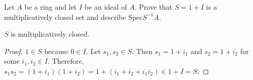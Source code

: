\begin{problem}
Let $A$ be a ring and let $I$ be an ideal of $A$.
Prove that $S = 1 + I$ is a multiplicatively closed set and describe $\text{Spec}S^{-1}A$.
\begin{sol}
    \begin{claim}
        $S$ is multiplicatively closed.
        \begin{proof}
            $1 \in S$ because $0 \in I$.
            Let $s_1, s_2 \in S$.
            Then $s_1 = 1 + i_1$ and $s_2 = 1 + i_2$ for some $i_1, i_2 \in I$.
            Therefore, $s_1s_2 = (1 + i_1)(1 + i_2) = 1 + (i_1 + i_2 + i_1i_2) \in 1 + I = S$.
        \end{proof}
    \end{claim}

    \begin{claim}
        

    \end{claim}
\end{sol}
\end{problem}